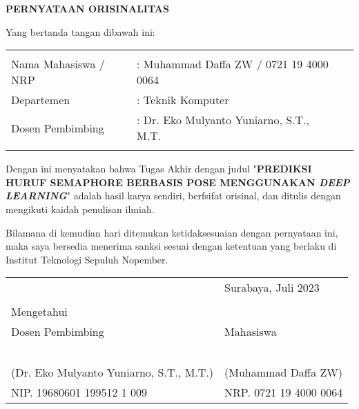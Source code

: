 \begin{center}
  \large
  \textbf{PERNYATAAN ORISINALITAS}
\end{center}

\thispagestyle{empty}

\vspace{2ex}


\noindent Yang bertanda tangan dibawah ini:

\noindent\begin{tabularx}{\textwidth}{X X l}
  & \\
  Nama Mahasiswa / NRP &: Muhammad Daffa ZW / 0721 19 4000 0064 \\
  Departemen &: Teknik Komputer \\
  Dosen Pembimbing &: Dr. Eko Mulyanto Yuniarno, S.T., M.T. \\
  & \\
\end{tabularx}

Dengan ini menyatakan bahwa Tugas Akhir dengan judul "\textbf{PREDIKSI HURUF SEMAPHORE BERBASIS POSE MENGGUNAKAN \emph{DEEP LEARNING}}" adalah hasil karya sendiri, berfsifat orisinal, dan ditulis dengan mengikuti kaidah penulisan ilmiah.

Bilamana di kemudian hari ditemukan ketidaksesuaian dengan pernyataan ini, maka saya bersedia menerima sanksi sesuai dengan ketentuan yang berlaku di Institut Teknologi Sepuluh Nopember.

\vspace{8ex}

\noindent\begin{tabularx}{\textwidth}{X l}
  & Surabaya, Juli 2023\\
  & \\
  Mengetahui & \\
  Dosen Pembimbing & Mahasiswa\\
  & \\
  & \\
  & \\
  & \\
  & \\
  (Dr. Eko Mulyanto Yuniarno, S.T., M.T.) & (Muhammad Daffa ZW) \\
  NIP. 19680601 199512 1 009 & NRP. 0721 19 4000 0064\\
\end{tabularx}